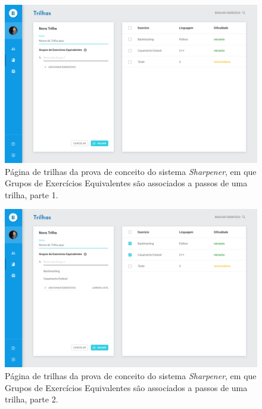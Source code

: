   \begin{figure}[htpb]
  \centering
  \includegraphics[width=\linewidth]{images/mocks/trackAdd3.png}
  \caption{Página de trilhas da prova de conceito do sistema \emph{Sharpener}, 
	  em que Grupos de Exercícios Equivalentes são associados a passos de uma trilha, parte 1.}%
  \label{fig:add_track3}
  \end{figure}
  
  \begin{figure}[htpb]
  \centering
  \includegraphics[width=\linewidth]{images/mocks/trackAdd4.png}
  \caption{Página de trilhas da prova de conceito do sistema \emph{Sharpener}, 
	  em que Grupos de Exercícios Equivalentes são associados a passos de uma trilha, parte 2.}%
  \label{fig:add_track4}
  \end{figure}
  
